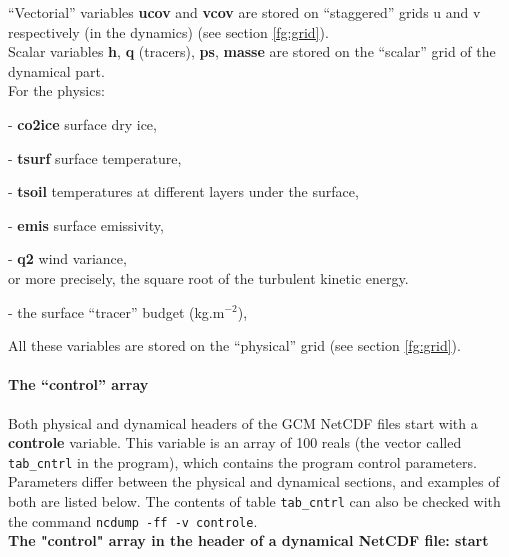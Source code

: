 \noindent
``Vectorial'' variables {\bf ucov} and {\bf vcov} are stored on
``staggered'' grids u and v respectively (in the dynamics)
(see section \ref{fg:grid}).\\
Scalar variables {\bf h}, {\bf q} (tracers), {\bf ps}, {\bf masse} are stored
on the ``scalar'' grid of the dynamical part.\\

\noindent
For the physics:
\begin{description}
\item - {\bf co2ice} surface dry ice,
\item - {\bf tsurf} surface temperature,
\item - {\bf tsoil} temperatures at different layers under the surface,
\item - {\bf emis} surface emissivity,
\item - {\bf q2} wind variance,\\
or more precisely, the square root of the turbulent kinetic energy.
\item - the surface ``tracer'' budget
 (kg.m$^{-2}$),\\
\end{description}

\noindent
All these variables are stored on the ``physical'' grid
(see section \ref{fg:grid}).\\

\paragraph{The ``control'' array}

\indent
Both physical and dynamical headers of the GCM NetCDF files start with
a {\bf controle} variable. This variable is an array of 100 reals (the vector
called {\tt tab\_cntrl} in the program), which contains the program control
parameters. 
Parameters differ between the physical and dynamical sections, and examples
of both are listed below. The contents of table {\tt tab\_cntrl} can also
be checked with the command {\tt ncdump -ff -v controle}.\\

\noindent
{\bf The "control" array in the header of a dynamical NetCDF file:
start}


